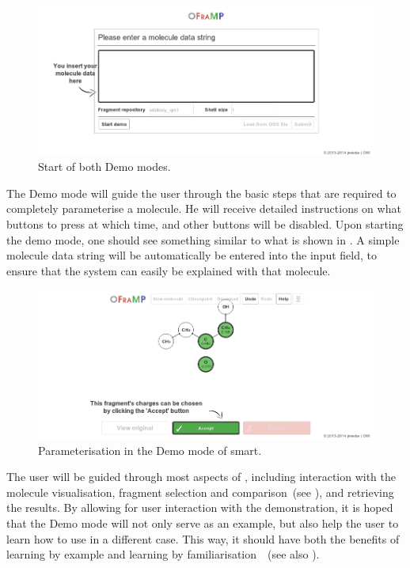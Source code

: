 \begin{figure}
\center
\includegraphics[width=.9\textwidth]{img/demo_1.png}
\caption{Start of both Demo modes.}
\end{figure}

The Demo mode will guide the user through the basic steps that are required to completely parameterise a molecule. He will receive detailed instructions on what buttons to press at which time, and other buttons will be disabled. Upon starting the demo mode, one should see something similar to what is shown in . A simple molecule data string will be automatically be entered into the input field, to ensure that the system can easily be explained with that molecule.

\begin{figure}
\center
\includegraphics[width=.9\textwidth]{img/demo_2.png}
\caption{Parameterisation in the Demo mode of \oframp{} smart.}
\end{figure}

The user will be guided through most aspects of \oframp, including interaction with the molecule visualisation, fragment selection and comparison~(see ), and retrieving the results. By allowing for user interaction with the demonstration, it is hoped that the Demo mode will not only serve as an example, but also help the user to learn how to use \oframp{} in a different case. This way, it should have both the benefits of learning by example and learning by familiarisation~\cite{sweller1994cognitive}~(see also ).

